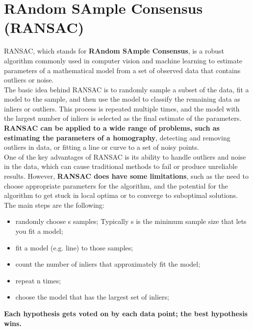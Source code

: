 \documentclass{article}
\begin{document}
\newpage

\section*{RAndom SAmple Consensus (RANSAC)}

RANSAC, which stands for \textbf{RAndom SAmple Consensus}, is a robust algorithm commonly used in computer vision and machine learning to estimate parameters of a mathematical model from a set of observed data that contains outliers or noise. \\

The basic idea behind RANSAC is to randomly sample a subset of the data, fit a model to the sample, and then use the model to classify the remaining data as inliers or outliers. This process is repeated multiple times, and the model with the largest number of inliers is selected as the final estimate of the parameters. \\

\textbf{RANSAC can be applied to a wide range of problems, such as estimating the parameters of a homography}, detecting and removing outliers in data, or fitting a line or curve to a set of noisy points. \\

One of the key advantages of RANSAC is its ability to handle outliers and noise in the data, which can cause traditional methods to fail or produce unreliable results. However, \textbf{RANSAC does have some limitations}, such as the need to choose appropriate parameters for the algorithm, and the potential for the algorithm to get stuck in local optima or to converge to suboptimal solutions.\\

The main steps are the following:
\begin{itemize}
    \item randomly choose s samples; Typically s is the minimum sample size that lets you fit a model;
    \item fit a model (e.g. line) to those samples;
    \item count the number of inliers that approximately fit the model;
    \item repeat n times;
    \item choose the model that has the largest set of inliers;
\end{itemize}

\textbf{Each hypothesis gets voted on by each data point; the best hypothesis wins.}
\end{document}
